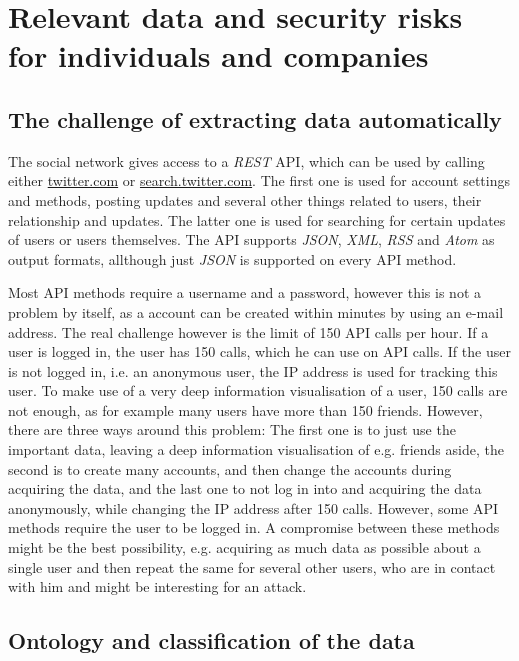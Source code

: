 \section{Relevant data and security risks for individuals and companies}
\label{sec:relevant_data}

\subsection{The challenge of extracting data automatically}

The \Twitter{} social network gives access to a \textit{REST} API, which can be
used by calling either \url{twitter.com} or \url{search.twitter.com}. The first
one is used for account settings and methods, posting updates and several other
things related to users, their relationship and updates. The latter one is used
for searching for certain updates of users or users themselves. The API
supports \textit{JSON}, \textit{XML}, \textit{RSS} and \textit{Atom} as output
formats, allthough just \textit{JSON} is supported on every API method.

Most API methods require a username and a password, however this is not a
problem by itself, as a \Twitter{} account can be created within minutes by
using an e-mail address. The real challenge however is the limit of 150 API calls
per hour. If a user is logged in, the user has 150 calls, which he can use on
API calls. If the user is not logged in, i.e. an anonymous user, the IP address
is used for tracking this user. To make use of a very deep information
visualisation of a user, 150 calls are not enough, as for example many users
have more than 150 friends. However, there are three ways around this problem:
The first one is to just use the important data, leaving a deep information
visualisation of e.g. friends aside, the second is to create many accounts, and
then change the accounts during acquiring the data, and the last one to not log
in into \Twitter{} and acquiring the data anonymously, while changing the IP
address after 150 calls. However, some API methods require the user to be
logged in. A compromise between these methods might be the best possibility,
e.g. acquiring as much data as possible about a single user and then repeat the
same for several other users, who are in contact with him and might be
interesting for an attack.

\subsection{Ontology and classification of the data}
\label{ssec:ontology}

